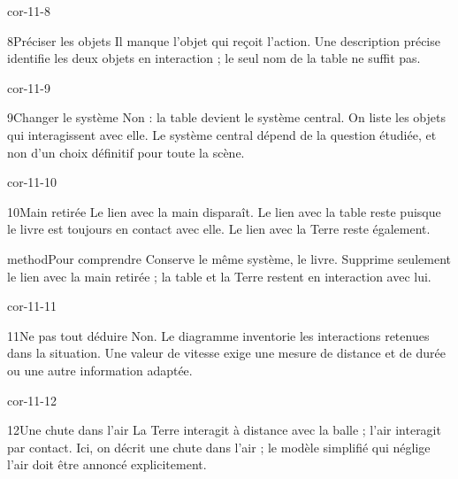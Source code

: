 \documentclass[12pt,twoside,openany]{book}
\begin{document}
\begin{blocLivre}{cor-11-8}
\begin{corrige}{8}{Préciser les objets}
Il manque l’objet qui reçoit l’action. Une description précise identifie les deux objets en interaction ; le seul nom de la table ne suffit pas.\par
\end{corrige}\end{blocLivre}
\begin{blocLivre}{cor-11-9}
\begin{corrige}{9}{Changer le système}
Non : la table devient le système central. On liste les objets qui interagissent avec elle. Le système central dépend de la question étudiée, et non d’un choix définitif pour toute la scène.\par
\end{corrige}\end{blocLivre}
\begin{blocLivre}{cor-11-10}
\begin{corrige}{10}{Main retirée}
Le lien avec la main disparaît. Le lien avec la table reste puisque le livre est toujours en contact avec elle. Le lien avec la Terre reste également.\par
\begin{pcEncadre}{method}{Pour comprendre}
Conserve le même système, le livre. Supprime seulement le lien avec la main retirée ; la table et la Terre restent en interaction avec lui.\par
\end{pcEncadre}
\end{corrige}\end{blocLivre}
\begin{blocLivre}{cor-11-11}
\begin{corrige}{11}{Ne pas tout déduire}
Non. Le diagramme inventorie les interactions retenues dans la situation. Une valeur de vitesse exige une mesure de distance et de durée ou une autre information adaptée.\par
\end{corrige}\end{blocLivre}
\begin{blocLivre}{cor-11-12}
\begin{corrige}{12}{Une chute dans l’air}
La Terre interagit à distance avec la balle ; l’air interagit par contact. Ici, on décrit une chute dans l’air ; le modèle simplifié qui néglige l’air doit être annoncé explicitement.\par
{}
\end{corrige}\end{blocLivre}
\end{document}
